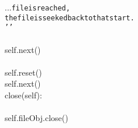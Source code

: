{{\begin{tabbing}
...{}{\texttt{\hspace{6pt}file\hspace{6pt}is\hspace{6pt}reached,\hspace{6pt}}}\\
{\texttt{\hspace{72pt}the\hspace{6pt}file\hspace{6pt}is\hspace{6pt}seeked\hspace{6pt}back\hspace{6pt}to\hspace{6pt}that\hspace{6pt}start.}}\\
{\texttt{\hspace{48pt}{'}}}{\texttt{{'}{'}}}\\
\\
\hspace{6pt}self.next()\\
\\
\hspace{72pt}self.reset()\\
\hspace{6pt}self.next()\\
\hspace{6pt}close(self):\\
\\
\hspace{48pt}self.fileObj.close()
\end{tabbing}}}
